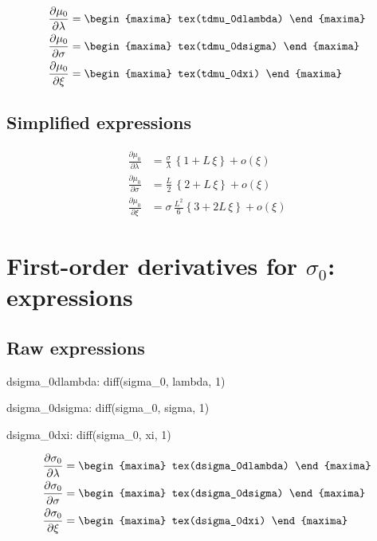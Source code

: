 {\color{MonVertF}
\begin{align*}
  \frac{\partial \mu_0}{\partial \lambda}
  &=
\begin{maxima}
  tex(tdmu_0dlambda)
\end{maxima}\\
 \frac{\partial \mu_0}{\partial \sigma}
  &=
\begin{maxima}
  tex(tdmu_0dsigma)
\end{maxima}\\
\frac{\partial \mu_0 }{\partial \xi}
  &=
\begin{maxima}
  tex(tdmu_0dxi)
\end{maxima}
\end{align*}
}

\subsection*{Simplified expressions}
{\color{red}
\begin{align*}
  \frac{\partial \mu_0}{\partial \lambda}
  &= \frac{\sigma}{\lambda}\, \left\{ 1 + L \, \xi \right\} + o(\xi) \\
 \frac{\partial \mu_0}{\partial \sigma}
  &= \frac{L}{2} \, \left\{ 2 + L\, \xi \right\} + o(\xi) \\
\frac{\partial \mu_0 }{\partial \xi}
  &=  \sigma \, \frac{L^2}{6} \left\{ 3  + 2 L\, \xi \right\} + o(\xi) 
\end{align*}
}

\section{First-order derivatives for $\sigma_0$: expressions}

\subsection*{Raw expressions}

\begin{maxima}
  dsigma_0dlambda: diff(sigma_0, lambda, 1)
\end{maxima}
\begin{maxima}
  dsigma_0dsigma: diff(sigma_0, sigma, 1)
\end{maxima}
\begin{maxima}
  dsigma_0dxi: diff(sigma_0, xi, 1)
\end{maxima}

{\color{MonVertF}
\begin{align*}
  \frac{\partial \sigma_0}{\partial \lambda}
  &=
    \begin{maxima}
      tex(dsigma_0dlambda)
    \end{maxima} \\
 \frac{\partial \sigma_0}{\partial \sigma}
  &=
    \begin{maxima}
      tex(dsigma_0dsigma)
    \end{maxima} \\
  \frac{\partial \sigma_0 }{\partial \xi}
  &= \begin{maxima}
      tex(dsigma_0dxi)
    \end{maxima} \\
\end{align*}
}

